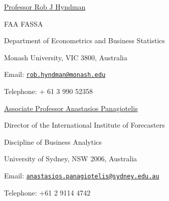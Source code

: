 \documentclass[10pt,a4paper,]{article}
\begin{document}
\href{https://robjhyndman.com/}{Professor Rob J Hyndman}

FAA FASSA

Department of Econometrics and Business Statistics

Monash University, VIC 3800, Australia

Email:
\href{mailto:rob.hyndman@monash.edu}{\nolinkurl{rob.hyndman@monash.edu}}

Telephone: + 61 3 990 52358

\bigskip

\href{https://anastasiospanagiotelis.netlify.app/}{Associate Professor Anastasios Panagiotelis}

Director of the International Institute of Forecasters

Discipline of Business Analytics

University of Sydney, NSW 2006, Australia

Email:
\href{mailto:anastasios.panagiotelis@sydney.edu.au}{\nolinkurl{anastasios.panagiotelis@sydney.edu.au}}

Telephone: +61 2 9114 4742
\end{document}
